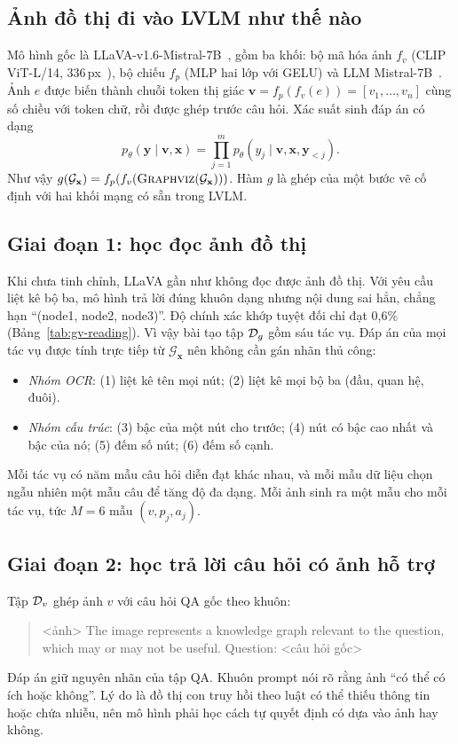 \subsection{Ảnh đồ thị đi vào LVLM như thế nào}
Mô hình gốc là LLaVA-v1.6-Mistral-7B~\cite{liu2024llavanext}, gồm ba khối: bộ mã hóa ảnh $f_v$ (CLIP ViT-L/14, 336\,px~\cite{radford2021clip}), bộ chiếu $f_p$ (MLP hai lớp với GELU) và LLM Mistral-7B~\cite{jiang2023mistral}. Ảnh $e$ được biến thành chuỗi token thị giác $\mathbf{v}=f_p(f_v(e))=[v_1,\dots,v_n]$ cùng số chiều với token chữ, rồi được ghép trước câu hỏi. Xác suất sinh đáp án có dạng
\begin{equation}
p_\theta(\mathbf{y}\mid\mathbf{v},\mathbf{x})=\prod_{j=1}^{m}p_\theta(y_j\mid\mathbf{v},\mathbf{x},\mathbf{y}_{<j}).\label{eq:gv-lvlm}
\end{equation}
Như vậy $g(\mathcal{G}_\mathbf{x})=f_p(f_v(\textsc{Graphviz}(\mathcal{G}_\mathbf{x})))$. Hàm $g$ là ghép của một bước vẽ cố định với hai khối mạng có sẵn trong LVLM.

\subsection{Giai đoạn 1: học đọc ảnh đồ thị}
Khi chưa tinh chỉnh, LLaVA gần như không đọc được ảnh đồ thị. Với yêu cầu liệt kê bộ ba, mô hình trả lời đúng khuôn dạng nhưng nội dung sai hẳn, chẳng hạn ``(node1, node2, node3)''. Độ chính xác khớp tuyệt đối chỉ đạt 0,6\% (Bảng~\ref{tab:gv-reading}). Vì vậy bài tạo tập $\mathcal{D}_g$ gồm sáu tác vụ. Đáp án của mọi tác vụ được tính trực tiếp từ $\mathcal{G}_\mathbf{x}$ nên không cần gán nhãn thủ công:
\begin{itemize}
\item \emph{Nhóm OCR}: (1) liệt kê tên mọi nút; (2) liệt kê mọi bộ ba (đầu, quan hệ, đuôi).
\item \emph{Nhóm cấu trúc}: (3) bậc của một nút cho trước; (4) nút có bậc cao nhất và bậc của nó; (5) đếm số nút; (6) đếm số cạnh.
\end{itemize}
Mỗi tác vụ có năm mẫu câu hỏi diễn đạt khác nhau, và mỗi mẫu dữ liệu chọn ngẫu nhiên một mẫu câu để tăng độ đa dạng. Mỗi ảnh sinh ra một mẫu cho mỗi tác vụ, tức $M=6$ mẫu $(v,p_j,a_j)$.

\subsection{Giai đoạn 2: học trả lời câu hỏi có ảnh hỗ trợ}
Tập $\mathcal{D}_v$ ghép ảnh $v$ với câu hỏi QA gốc theo khuôn:
\begin{quote}\small\ttfamily
<ảnh> The image represents a knowledge graph relevant to the question, which may or may not be useful. Question: <câu hỏi gốc>
\end{quote}
Đáp án giữ nguyên nhãn của tập QA. Khuôn prompt nói rõ rằng ảnh ``có thể có ích hoặc không''. Lý do là đồ thị con truy hồi theo luật có thể thiếu thông tin hoặc chứa nhiễu, nên mô hình phải học cách tự quyết định có dựa vào ảnh hay không.

